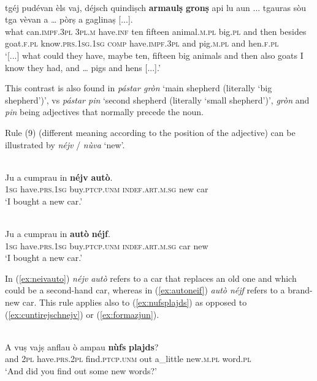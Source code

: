 \ea
\label{ex:armaulsgrons}
\\
\gll   [...] tgéj pudévan èls vaj, déjsch quindiṣch \textbf{armaulṣ} \textbf{gronṣ} api lu aun ... tgauras sòu tga vèvan a … pòrṣ a gaglinaṣ [...]. \\
[...] what can.\textsc{impf.3pl} \textsc{3pl.m} have.\textsc{inf} ten fifteen animal.\textsc{m.pl} big.\textsc{pl} and then besides {} goat.\textsc{f.pl} know.\textsc{prs.1sg.1sg} \textsc{comp} have.\textsc{impf.3pl} and {} pig.\textsc{m.pl} and hen.\textsc{f.pl}\\
\glt `[...] what could they have, maybe ten, fifteen big animals and then also goats I know they had, and … pigs and hens [...].'
\z

This contrast is also found in \textit{pástar gròn} `main shepherd (literally `big shepherd')', vs \textit{pástar pin} `second shepherd (literally `small shepherd')', \textit{gròn} and \textit{pin} being adjectives that normally precede the noun.


Rule (9) (different meaning according to the position of the adjective) can be illustrated by \textit{néjv} / \textit{nùva} `new'.

\ea
\label{ex:neivauto}
\\
\gll Ju a cumprau in \textbf{néjv} \textbf{autò}.\\
\textsc{1sg} have\textsc{.prs.1sg} buy.\textsc{ptcp.unm} \textsc{indef.art.m.sg} new car\\
\glt `I bought a new car.'
\z

\ea
\label{ex:autoneif}
\\
\gll Ju a cumprau in \textbf{autò} \textbf{néjf}.\\
\textsc{1sg} have\textsc{.prs.1sg} buy.\textsc{ptcp.unm} \textsc{indef.art.m.sg} car new\\
\glt `I bought a new car.'
\z

In (\ref{ex:neivauto}) \textit{néjv autò} refers to a car that replaces an old one and which could be a second-hand car, whereas in (\ref{ex:autoneif}) \textit{autò néjf} refers to a brand-new car. This rule applies also to (\ref{ex:nufsplajds}) as opposed to (\ref{ex:cuntirejschnejv}) or (\ref{ex:formazjun}).

\ea
\label{ex:nufsplajds}
\\
\gll A vuṣ vajṣ anflau ò ampau \textbf{nùfs} \textbf{plajds}?    \\
and \textsc{2pl} have.\textsc{prs.2pl} find.\textsc{ptcp.unm} out a\_little new.\textsc{m.pl} word.\textsc{pl}\\
\glt `And did you find out some new words?'
\z



